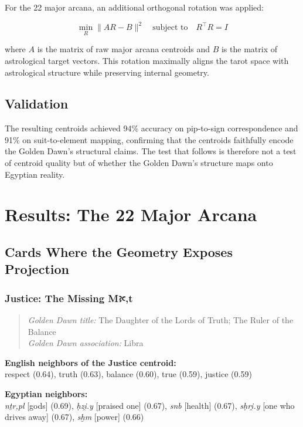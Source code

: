 \documentclass[11pt, a4paper]{article}
\begin{document}
For the 22 major arcana, an additional orthogonal rotation was applied:

\[
\min_R \|A R - B\|^2 \quad \text{subject to} \quad R^\top R = I
\]

where $A$ is the matrix of raw major arcana centroids and $B$ is the matrix of astrological target vectors. This rotation maximally aligns the tarot space with astrological structure while preserving internal geometry.

\subsection{Validation}

The resulting centroids achieved 94\% accuracy on pip-to-sign correspondence and 91\% on suit-to-element mapping, confirming that the centroids faithfully encode the Golden Dawn's structural claims. The test that follows is therefore not a test of centroid quality but of whether the Golden Dawn's structure maps onto Egyptian reality.

\section{Results: The 22 Major Arcana}
\label{sec:results}

\subsection{Cards Where the Geometry Exposes Projection}

\subsubsection{Justice: The Missing Mꜣꜥ,t}

\begin{quote}
\textit{Golden Dawn title:} The Daughter of the Lords of Truth; The Ruler of the Balance \\
\textit{Golden Dawn association:} Libra
\end{quote}

\noindent\textbf{English neighbors of the Justice centroid:}\\
\hspace{1em}respect (0.64), truth (0.63), balance (0.60), true (0.59), justice (0.59)

\noindent\textbf{Egyptian neighbors:}\\
\hspace{1em}\textit{nṯr,pl} [gods] (0.69), \textit{ḥzi̯.y} [praised one] (0.67), \textit{snb} [health] (0.67), \textit{sḥri̯.y} [one who drives away] (0.67), \textit{sḫm} [power] (0.66)
\end{document}
